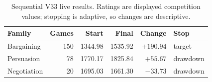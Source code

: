 \begin{table}[t]
  \caption{Sequential V33 live results. Ratings are displayed competition
  values; stopping is adaptive, so changes are descriptive.}
  \label{tab:v33-results}
  \centering
  \small
  \begin{tabular}{lrrrrl}
    \toprule
    Family & Games & Start & Final & Change & Stop \\
    \midrule
    Bargaining & 150 & 1344.98 & 1535.92 & $+190.94$ & target \\
    Persuasion & 78 & 1770.17 & 1825.84 & $+55.67$ & drawdown \\
    Negotiation & 20 & 1695.03 & 1661.30 & $-33.73$ & drawdown \\
    \bottomrule
  \end{tabular}
\end{table}
